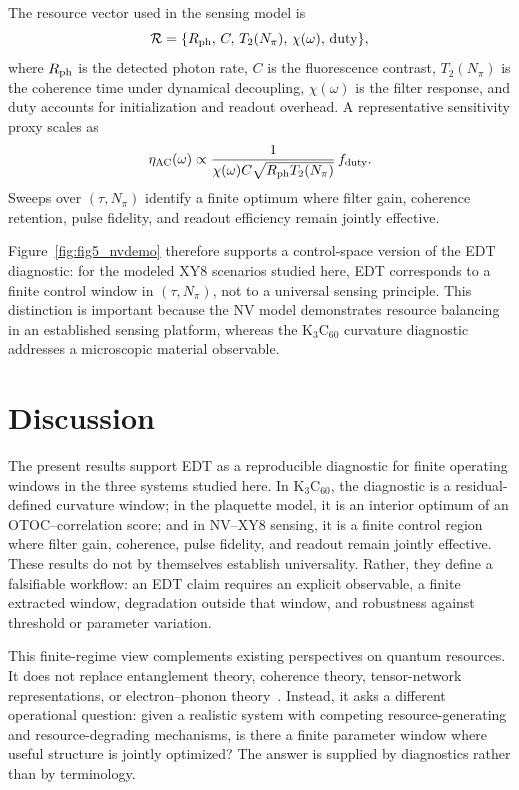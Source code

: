 \documentclass[
  prx,
  reprint,
  superscriptaddress,
  amsmath,
  amssymb,
  aps
]{revtex4-2}
\begin{document}
The resource vector used in the sensing model is
\begin{equation}
\mathcal{R}
=
\{R_{\rm ph},\,C,\,T_2(N_\pi),\,\chi(\omega),\,\mathrm{duty}\},
\label{eq:nv_resource_vector}
\end{equation}
where $R_{\rm ph}$ is the detected photon rate, $C$ is the fluorescence contrast, $T_2(N_\pi)$ is the coherence time under dynamical decoupling, $\chi(\omega)$ is the filter response, and $\mathrm{duty}$ accounts for initialization and readout overhead. A representative sensitivity proxy scales as
\begin{equation}
\eta_{\rm AC}(\omega)
\propto
\frac{1}{\chi(\omega)C\sqrt{R_{\rm ph}T_2(N_\pi)}}\,f_{\rm duty}.
\label{eq:nv_sensitivity}
\end{equation}
Sweeps over $(\tau,N_\pi)$ identify a finite optimum where filter gain, coherence retention, pulse fidelity, and readout efficiency remain jointly effective.

Figure~\ref{fig:fig5_nvdemo} therefore supports a control-space version of the EDT diagnostic: for the modeled XY8 scenarios studied here, EDT corresponds to a finite control window in $(\tau,N_\pi)$, not to a universal sensing principle. This distinction is important because the NV model demonstrates resource balancing in an established sensing platform, whereas the K$_3$C$_{60}$ curvature diagnostic addresses a microscopic material observable.

\section{Discussion}

The present results support EDT as a reproducible diagnostic for finite operating windows in the three systems studied here. In K$_3$C$_{60}$, the diagnostic is a residual-defined curvature window; in the plaquette model, it is an interior optimum of an OTOC--correlation score; and in NV--XY8 sensing, it is a finite control region where filter gain, coherence, pulse fidelity, and readout remain jointly effective. These results do not by themselves establish universality. Rather, they define a falsifiable workflow: an EDT claim requires an explicit observable, a finite extracted window, degradation outside that window, and robustness against threshold or parameter variation.

This finite-regime view complements existing perspectives on quantum resources. It does not replace entanglement theory, coherence theory, tensor-network representations, or electron--phonon theory~\cite{Horodecki2009,Streltsov2017,Verstraete2008,Orus2014,BardeenPines1955,BCS1957}. Instead, it asks a different operational question: given a realistic system with competing resource-generating and resource-degrading mechanisms, is there a finite parameter window where useful structure is jointly optimized? The answer is supplied by diagnostics rather than by terminology.
\end{document}
